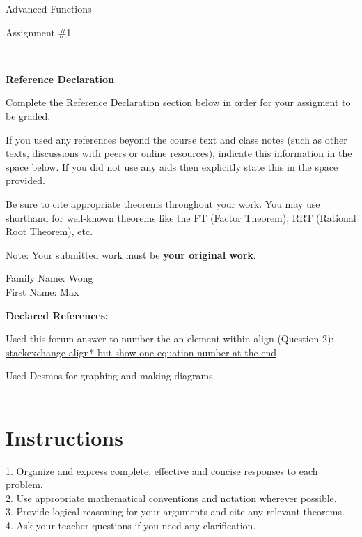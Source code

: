 \documentclass[12pt]{book}
\begin{document}
\vspace{-1.0in}\begin{center}
\Large{Advanced Functions }

\Large{Assignment \#1}


\end{center}


\vspace{0.015in}\hrulefill\ 

\textbf{Reference Declaration} %

Complete the Reference Declaration section below in order for your assigment to be graded.

If you used any references beyond the course text and class notes (such as other texts, discussions with peers or online resources), indicate this information in the space below.  If you did not use any aids then explicitly state this in the space provided. 

Be sure to cite appropriate theorems throughout your work. You may use shorthand for well-known theorems like the FT (Factor Theorem), RRT (Rational Root Theorem), etc. 

Note: Your submitted work must be \textbf{your original work}. 

Family Name: Wong \\%
First Name: Max%

\textbf{Declared References:} 

Used this forum answer to number the an element within align (Question 2): \\
\href{https://tex.stackexchange.com/questions/42726/align-but-show-one-equation-number-at-the-end}{stackexchange align* but show one equation number at the end}

\vspace{1em}
Used Desmos for graphing and making diagrams. \\


\vspace{0.015in}\hrulefill\ 

\newpage


\section*{Instructions}
\begin{center}
\setlength{\fboxrule}{2pt}
\begin{boxedminipage}{6.5in}
1.	Organize and express complete, effective and concise responses to each problem.\\
2.	Use appropriate mathematical conventions and notation wherever possible.\\
3.	Provide logical reasoning for your arguments and cite any relevant theorems. \\
4.  Ask your teacher questions if you need any clarification.
\end{boxedminipage}
\end{center} 
\end{document}
